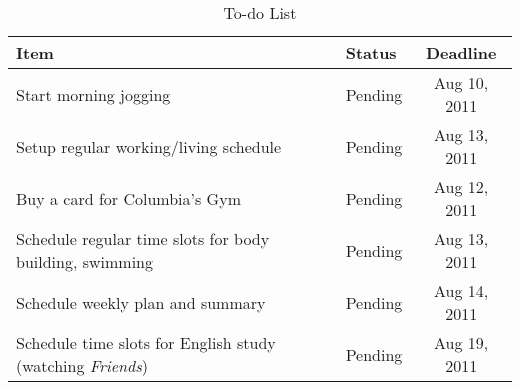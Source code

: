 \begin{table}[htbp] 
\begin{tabular}{|l|l|c|}
  \hline
  Item & Status & Deadline \\
  \hline
  Start morning jogging & Pending & Aug 10, 2011 \\
  Setup regular working/living schedule & Pending & Aug 13, 2011 \\
  Buy a card for Columbia's Gym & Pending & Aug 12, 2011 \\
  Schedule regular time slots for body building, swimming & Pending & Aug 13, 2011 \\
  Schedule weekly plan and summary & Pending & Aug 14, 2011 \\
  Schedule time slots for English study (watching \emph{Friends}) & Pending & Aug 19, 2011 \\
  \hline
\end{tabular}
\caption{To-do List}
\end{table}
